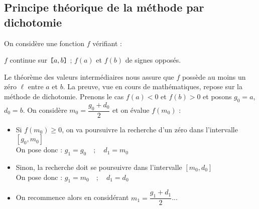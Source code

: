 \subsection{Principe théorique de la méthode par dichotomie}
On considère une fonction $f$ vérifiant : 
\begin{center} $f$ continue sur $\verb![!a,b\verb!]!$ ;  $f(a)$ et $f(b)$ de signes opposés.
\end{center} Le théorème des valeurs intermédiaires nous assure que $f$ possède au moins un zéro $\ell$ entre $a$ et $b$. La preuve, vue en cours de mathématiques, repose sur la méthode de dichotomie. Prenons le cas $f(a)<0$ et $f(b)>0$ et posons $g_0=a$, $d_0=b$. 
 On considère $m_0 = \dfrac{g_0+d_0}{2}$ et on évalue $f(m_0)$ : 
\begin{itemize}
 \item Si $f(m_0)\geq 0$, on va poursuivre la recherche d'un zéro dans l'intervalle  {$[g_0,m_0]$} \\On pose donc  : 
 $g_1 =  {g_0} \quad ;\quad  d_1 =  {m_0}$\vspace*{2mm}
  \item Sinon,  la recherche doit se poursuivre  dans l'intervalle  {$[m_0,d_0]$} \\ On pose donc  : 
 $g_1 =  {m_0} \quad ; \quad d_1 =  {d_0}$\vspace*{2mm}
 \item On recommence alors en considérant $m_1 = \dfrac{g_1+d_1}{2}$...\\
 \end{itemize}


